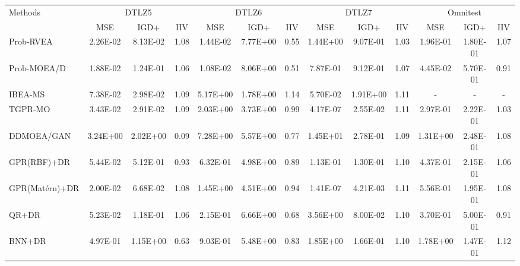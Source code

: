 \documentclass{article}
\begin{document}
\begin{table}[!htbp]
{\begin{tabular}{l ccc ccc ccc ccc}
Methods & \multicolumn{3}{c}{DTLZ5} & \multicolumn{3}{c}{DTLZ6} & \multicolumn{3}{c}{DTLZ7} & \multicolumn{3}{c}{Omnitest} \\
\cmidrule(lr){2-4} \cmidrule(lr){5-7} \cmidrule(lr){8-10} \cmidrule(lr){11-13}
& MSE & IGD+ & HV & MSE & IGD+ & HV & MSE & IGD+ & HV & MSE & IGD+ & HV \\
\midrule
Prob-RVEA    & 2.26E-02 & 8.13E-02 & 1.08 & 1.44E-02 & 7.77E+00 & 0.55 & 1.44E+00 & 9.07E-01 & 1.03 & 1.96E-01 & 1.80E-01 & 1.07 \\
Prob-MOEA/D  & 1.88E-02 & 1.24E-01 & 1.06 & 1.08E-02 & 8.06E+00 & 0.51 & 7.87E-01 & 9.12E-01 & 1.07 & 4.45E-02 & 5.70E-01 & 0.91 \\
IBEA-MS      & 7.38E-02 & 2.98E-02 & 1.09 & 5.17E+00 & 1.78E+00 & 1.14 & 5.70E-02 & 1.91E+00 & 1.11 & - & - & - \\
TGPR-MO      & 3.43E-02 & 2.91E-02 & 1.09 & 2.03E+00 & 3.73E+00 & 0.99 & 4.17E-07 & 2.55E-02 & 1.11 & 2.97E-01 & 2.22E-01 & 1.03 \\
DDMOEA/GAN   & 3.24E+00 & 2.02E+00 & 0.09 & 7.28E+00 & 5.57E+00 & 0.77 & 1.45E+01 & 2.78E-01 & 1.09 & 1.31E+00 & 2.48E-01 & 1.08 \\
GPR(RBF)+DR  & 5.44E-02 & 5.12E-01 & 0.93 & 6.32E-01 & 4.98E+00 & 0.89 & 1.13E-01 & 1.30E-01 & 1.10 & 4.37E-01 & 2.15E-01 & 1.06 \\
GPR(Mat\'ern)+DR  & 2.00E-02 & 6.68E-02 & 1.08 & 1.45E+00 & 4.51E+00 & 0.94 & 1.41E-07 & 4.21E-03 & 1.11 & 5.56E-01 & 1.95E-01 & 1.08 \\
QR+DR        & 5.23E-02 & 1.18E-01 & 1.06 & 2.15E-01 & 6.66E+00 & 0.68 & 3.56E+00 & 8.00E-02 & 1.10 & 3.70E-01 & 5.00E-01 & 0.91 \\
BNN+DR       & 4.97E-01 & 1.15E+00 & 0.63 & 9.03E-01 & 5.48E+00 & 0.83 & 1.85E+00 & 1.66E-01 & 1.10 & 1.78E+00 & 1.47E-01 & 1.12 \\
\bottomrule
\end{tabular}
}
\end{table}
\end{document}
